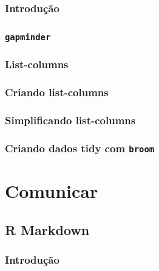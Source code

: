 \documentclass[
]{latex/krantz}
\theoremstyle{definition}
\theoremstyle{definition}
\theoremstyle{definition}
\theoremstyle{definition}
\theoremstyle{remark}
\begin{document}
\hypertarget{introduuxe7uxe3o-16}{%
\section{Introdução}\label{introduuxe7uxe3o-16}}

\hypertarget{gapminder}{%
\section{\texorpdfstring{\texttt{gapminder}}{gapminder}}\label{gapminder}}

\hypertarget{list-columns}{%
\section{List-columns}\label{list-columns}}

\hypertarget{criando-list-columns}{%
\section{Criando list-columns}\label{criando-list-columns}}

\hypertarget{simplificando-list-columns}{%
\section{Simplificando list-columns}\label{simplificando-list-columns}}

\hypertarget{criando-dados-tidy-com-broom}{%
\section{\texorpdfstring{Criando dados tidy com \texttt{broom}}{Criando dados tidy com broom}}\label{criando-dados-tidy-com-broom}}

\hypertarget{part-comunicar}{%
\part{Comunicar}\label{part-comunicar}}

\hypertarget{r-markdown}{%
\chapter{R Markdown}\label{r-markdown}}

\hypertarget{introduuxe7uxe3o-17}{%
\section{Introdução}\label{introduuxe7uxe3o-17}}
\end{document}
